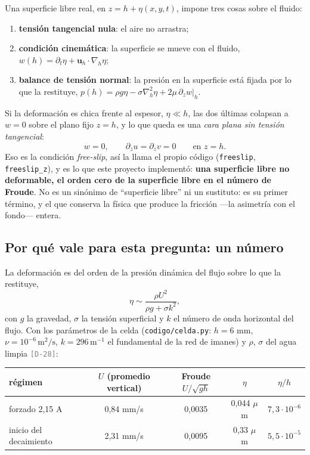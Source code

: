 \documentclass[11pt,a4paper]{article}
\newcommand{\etq}[1]{\textcolor{gray}{\texttt{[#1]}}}
\begin{document}
Una superficie libre real, en $z=h+\eta(x,y,t)$, impone tres cosas sobre el fluido:
\begin{enumerate}
  \item \textbf{tensión tangencial nula}: el aire no arrastra;
  \item \textbf{condición cinemática}: la superficie se mueve con el fluido,
        $w(h)=\partial_t\eta+\boldsymbol u_h\cdot\nabla_h\eta$;
  \item \textbf{balance de tensión normal}: la presión en la superficie está fijada por lo
        que la restituye, $p(h)=\rho g\eta-\sigma\nabla_h^2\eta+2\mu\,\partial_z w|_h$.
\end{enumerate}
Si la deformación es chica frente al espesor, $\eta\ll h$, las dos últimas colapsan a
$w=0$ sobre el plano fijo $z=h$, y lo que queda es una \emph{cara plana sin tensión
tangencial}:
\begin{equation}
  w=0,\qquad \partial_z u=\partial_z v=0\qquad\text{en } z=h.
  \label{eq:freeslip}
\end{equation}
Eso es la condición \emph{free-slip}, así la llama el propio código (\texttt{freeslip},
\texttt{freeslip\_z}), y es lo que este proyecto implementó: \textbf{una superficie libre
no deformable, el orden cero de la superficie libre en el número de Froude}. No es un
sinónimo de ``superficie libre'' ni un sustituto: es su primer término, y el que
conserva la física que produce la fricción ---la asimetría con el fondo--- entera.

\subsection{Por qué vale para esta pregunta: un número}
\label{sec:eta}

La deformación es del orden de la presión dinámica del flujo sobre lo que la restituye,
\begin{equation}
  \eta\sim\frac{\rho U^2}{\rho g+\sigma k^2},
\end{equation}
con $g$ la gravedad, $\sigma$ la tensión superficial y $k$ el número de onda horizontal
del flujo. Con los parámetros de la celda (\texttt{codigo/celda.py}: $h=6$ mm,
$\nu=10^{-6}\,\mathrm{m^2/s}$, $k=296\,\mathrm{m^{-1}}$ el fundamental de la red de
imanes) y $\rho$, $\sigma$ del agua limpia \etq{D-28}:

\begin{center}
\begin{tabular}{lcccc}
\toprule
régimen & $U$ (promedio vertical) & Froude $U/\sqrt{gh}$ & $\eta$ & $\eta/h$\\
\midrule
forzado 2,15 A & 0,84 mm/s & 0,0035 & 0,044 $\mu$m & $7{,}3\cdot10^{-6}$\\
inicio del decaimiento & 2,31 mm/s & 0,0095 & 0,33 $\mu$m & $5{,}5\cdot10^{-5}$\\
\bottomrule
\end{tabular}
\end{center}
\end{document}
